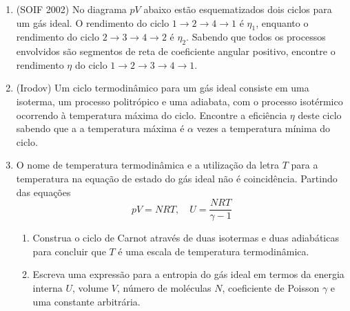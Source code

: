 \begin{enumerate}
    \item
        (SOIF 2002) No diagrama $pV$ abaixo estão esquematizados dois ciclos
        para um gás ideal. O rendimento do ciclo $1\rightarrow2\rightarrow4
        \rightarrow1$ é $\eta_1$, enquanto o rendimento do ciclo $2\rightarrow3
        \rightarrow4\rightarrow2$ é $\eta_2$. Sabendo que todos os processos
        envolvidos são segmentos de reta de coeficiente angular positivo,
        encontre o rendimento $\eta$ do ciclo $1\rightarrow2\rightarrow3
        \rightarrow4 \rightarrow1$.
        \begin{figure}[H]
            \centering
        \end{figure}

    \item
        (Irodov) Um ciclo termodinâmico para um gás ideal consiste em uma
        isoterma, um processo politrópico e uma adiabata, com o processo
        isotérmico ocorrendo à temperatura máxima do ciclo. Encontre a
        eficiência $\eta$ deste ciclo sabendo que a a temperatura máxima é
        $\alpha$ vezes a temperatura mínima do ciclo.

    \item
        O nome de temperatura termodinâmica e a utilização da letra $T$ para a
        temperatura na equação de estado do gás ideal não é coincidência.
        Partindo das equações
        $$pV=NRT,\quad U=\frac{NRT}{\gamma-1}$$
        \begin{enumerate}
            \item
                Construa o ciclo de Carnot através de duas isotermas e duas
                adiabáticas para concluir que $T$ é uma escala de temperatura
                termodinâmica.
            \item
                Escreva uma expressão para a entropia do gás ideal em termos da
                energia interna $U$, volume $V$, número de moléculas $N$,
                coeficiente de Poisson $\gamma$ e uma constante arbitrária.
        \end{enumerate}


\end{enumerate}
